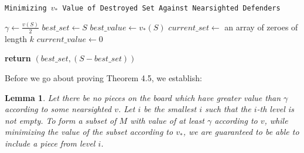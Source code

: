 \documentclass{article}
\theoremstyle{plain}
\newtheorem{lem}[thm]{Lemma}
\theoremstyle{definition}
\theoremstyle{remark}
\begin{document}
\begin{center}
  \begin{minipage}{1\linewidth} %
    \begin{algorithm}[H]

      \caption{\texttt{Minimizing $v_{*}$ Value of Destroyed Set Against Nearsighted Defenders}} %
      \label{alg:nearsighted}   %


      \medskip
      $\gamma \leftarrow \frac{v(S)}{2}$\;
      $best\_set \leftarrow S$\;
      $best\_value \leftarrow v_{*}(S)$\;
      $current\_set \leftarrow $ an array of zeroes of length $k$\;
      $current\_value \leftarrow 0$\;
      \medskip

       {
         {
        }
      }
     \medskip
      {\bf return} $(best\_set, (S - best\_set))$\;
    \end{algorithm}
  \end{minipage}
\end{center}

Before we go about proving Theorem 4.5, we establish:

\begin{lem}
Let there be no pieces on the board which have greater value than $\gamma$ according to some nearsighted $v$. Let $i$ be the smallest $i$ such that the $i$-th level is not empty. To form a subset of $M$ with value of at least $\gamma$ according to $v$, while minimizing the value of the subset according to $v_{*}$, we are guaranteed to be able to include a piece from level $i$.
\end{lem}
\end{document}
